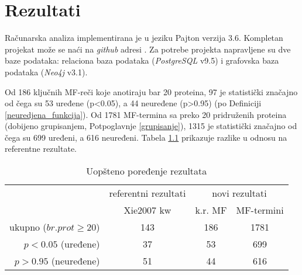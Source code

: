 
\chapter{Rezultati} %

\label{Rezultati} %

Računarska analiza implementirana je u jeziku Pajton  verzija 3.6.
Kompletan projekat može se naći na \textit{github} adresi \cite{projekat}. Za
potrebe projekta napravljene su dve baze podataka: relaciona baza podataka
(\textit{PostgreSQL} v9.5) i grafovska baza podataka (\textit{Neo4j} v3.1).

Od 186 ključnih MF-reči  koje anotiraju bar 20 proteina, 97 je statistički
značajno od čega su 53 uređene (p<0.05), a 44 neuređene (p>0.95) (po Definiciji
\ref{neuredjena_funkcija}).  Od 1781 MF-termina sa preko 20 pridruženih
proteina (dobijeno grupisanjem, Potpoglavnje \ref{grupisanje}), 1315 je
statistički značajno od čega su 699 uređeni, a 616 neuređeni.  Tabela
\ref{tab:kw_uopsteno} prikazuje razlike u odnosu na referentne rezultate.

\begin{table}[htpb]
\begin{tabular}{|r|c|c|c|}
  \hline
                     & \small referentni rezultati  & \multicolumn{2}{c|}{ novi rezultati} \\
                     & Xie2007 kw & k.r. MF  & MF-termini                  \\
  \hline
  ukupno ($br. prot\ge20$)     & 143        & 186    & 1781                        \\
  $p<0.05$ (uređene)   & 37         & 53     & 699                         \\
  $p>0.95$ (neuređene) & 51         & 44     & 616                         \\
  \hline
\end{tabular}
  \centering
  \caption{Uopšteno poređenje rezultata}
  \label{tab:kw_uopsteno}
\end{table}

